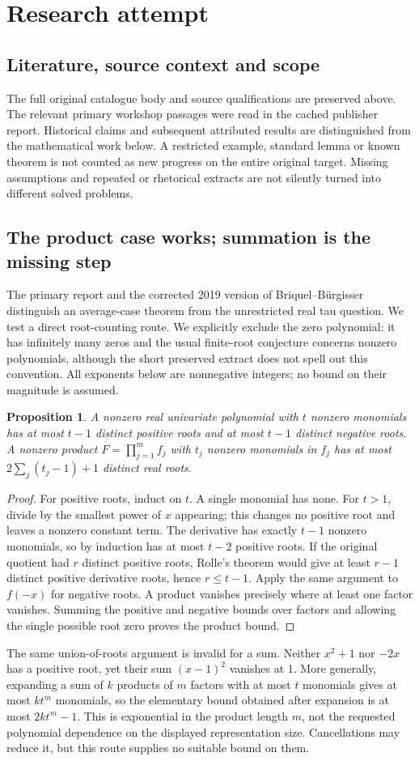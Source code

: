 \documentclass[11pt]{article}
\newtheorem{proposition}{Proposition}
\begin{document}
\section{Research attempt}
\subsection{Literature, source context and scope}
The full original catalogue body and source qualifications are preserved above. The relevant primary workshop passages were read in the cached publisher report. Historical claims and subsequent attributed results are distinguished from the mathematical work below. A restricted example, standard lemma or known theorem is not counted as new progress on the entire original target. Missing assumptions and repeated or rhetorical extracts are not silently turned into different solved problems.

\subsection{The product case works; summation is the missing step}
The primary report and the corrected 2019 version of Briquel--Bürgisser distinguish an average-case theorem from the unrestricted real tau question. We test a direct root-counting route. We explicitly exclude the zero polynomial: it has infinitely many zeros and the usual finite-root conjecture concerns nonzero polynomials, although the short preserved extract does not spell out this convention. All exponents below are nonnegative integers; no bound on their magnitude is assumed.
\begin{proposition}
A nonzero real univariate polynomial with $t$ nonzero monomials has at most $t-1$ distinct positive roots and at most $t-1$ distinct negative roots. A nonzero product $F=\prod_{j=1}^m f_j$ with $t_j$ nonzero monomials in $f_j$ has at most $2\sum_j(t_j-1)+1$ distinct real roots.
\end{proposition}
\begin{proof}
For positive roots, induct on $t$. A single monomial has none. For $t>1$, divide by the smallest power of $x$ appearing; this changes no positive root and leaves a nonzero constant term. The derivative has exactly $t-1$ nonzero monomials, so by induction has at most $t-2$ positive roots. If the original quotient had $r$ distinct positive roots, Rolle's theorem would give at least $r-1$ distinct positive derivative roots, hence $r\le t-1$. Apply the same argument to $f(-x)$ for negative roots. A product vanishes precisely where at least one factor vanishes. Summing the positive and negative bounds over factors and allowing the single possible root zero proves the product bound.
\end{proof}
The same union-of-roots argument is invalid for a sum. Neither $x^2+1$ nor $-2x$ has a positive root, yet their sum $(x-1)^2$ vanishes at 1. More generally, expanding a sum of $k$ products of $m$ factors with at most $t$ monomials gives at most $kt^m$ monomials, so the elementary bound obtained after expansion is at most $2kt^m-1$. This is exponential in the product length $m$, not the requested polynomial dependence on the displayed representation size. Cancellations may reduce it, but this route supplies no suitable bound on them.
\end{document}
